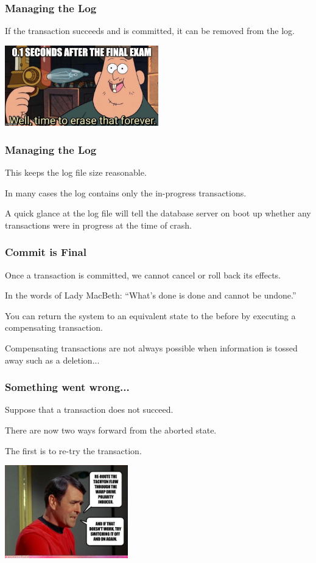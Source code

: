 \begin{frame}
\frametitle{Managing the Log}

If the transaction succeeds and is committed, it can be removed from the log. 

\begin{center}
	\includegraphics[width=0.5\textwidth]{images/finalexam.jpg}
\end{center}


\end{frame}

\begin{frame}
\frametitle{Managing the Log}

This keeps the log file size reasonable. 

In many cases the log contains only the in-progress transactions. 

A quick glance at the log file will tell the database server on boot up whether any transactions were in progress at the time of crash.


\end{frame}

\begin{frame}
\frametitle{Commit is Final}

Once a transaction is committed, we cannot cancel or roll back its effects. 

In the words of Lady MacBeth: ``What's done is done and cannot be undone.'' 

You can return the system to an equivalent state to the before by executing a \alert{compensating transaction}.

 Compensating transactions are not always possible when information is tossed away such as a deletion...

\end{frame}

\begin{frame}
\frametitle{Something went wrong...}

Suppose that a transaction does not succeed. 

There are now two ways forward from the aborted state. 

The first is to re-try the transaction. 

\begin{center}
	\includegraphics[width=0.4\textwidth]{images/tryagain.jpg}
\end{center}


\end{frame}

